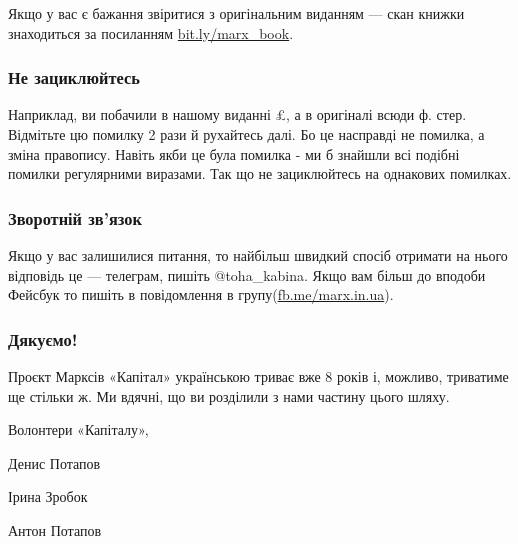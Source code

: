 \documentclass{kapital}
\begin{document}
  \noindent{}Якщо у вас є бажання звіритися з оригінальним виданням — 
  скан книжки знаходиться за посиланням \underline{bit.ly/marx\_book}.

  \subsubsection*{Не зациклюйтесь}

  Наприклад, ви побачили в нашому виданні £, а в оригіналі всюди ф. стер. Відмітьте
  цю помилку 2 рази й рухайтесь далі. Бо це насправді не помилка, а зміна правопису.
  Навіть якби це була помилка - ми б знайшли всі подібні помилки регулярними виразами.
  Так що не зациклюйтесь на однакових помилках.

  \subsubsection*{Зворотній зв'язок}


  Якщо у вас залишилися питання, то найбільш швидкий спосіб отримати 
  на нього відповідь це — телеграм, пишіть @toha\_kabina. Якщо вам 
  більш до вподоби Фейсбук то пишіть в повідомлення в 
  групу(\underline{fb.me/marx.in.ua}).

  \subsubsection*{Дякуємо!}

  Проєкт Марксів «Капітал» українською триває вже 8 років і, можливо, триватиме ще стільки ж. Ми вдячні, що ви
  розділили з нами частину цього шляху.
  
  \bigskip{}

  \noindent{}Волонтери «Капіталу»,

  \medskip{}

  \noindent{}Денис Потапов

  \noindent{}Ірина Зробок

  \noindent{}Антон Потапов
\end{document}
